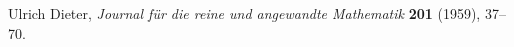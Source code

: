 Ulrich Dieter, {\sl Journal f\"ur die reine und angewandte Mathematik\/}
{\bf 201} (1959), 37--70.\bye
